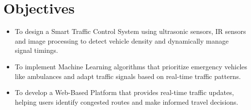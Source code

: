 \documentclass[12pt]{report}
\begin{document}
\section{Objectives}
\begin{itemize}
\item To design a Smart Traffic Control System using ultrasonic sensors, IR sensors and image processing to detect vehicle density and dynamically manage signal timings.
\item To implement Machine Learning algorithms that prioritize emergency vehicles like ambulances and adapt traffic signals based on real-time traffic patterns.
\item To develop a Web-Based Platform that provides real-time traffic updates, helping users identify congested routes and make informed travel decisions.
\end{itemize}
\end{document}
